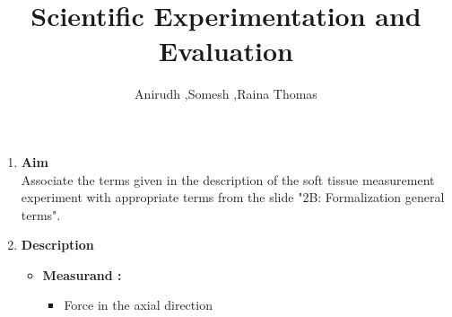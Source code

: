 \documentclass[10pt,a4paper]{article}
\author{Anirudh ,Somesh ,Raina Thomas}
\title{
	\textbf{Scientific Experimentation and Evaluation}
	}
\begin{document}
	

\Large
\begin{enumerate}[label=\Roman*]
\item
\Large{\textbf{Aim}}\\

Associate the terms given in the description of the soft tissue measurement experiment with appropriate terms from the slide "2B: Formalization general terms".
\vspace{0.3cm}
\item
\Large{\textbf{Description}}\\

\begin{itemize}
	\item	
	\textbf{Measurand :}
	\begin{itemize}
		\item
		Force in the axial direction
	\end{itemize}
	

\end{itemize}
\end{enumerate}
\end{document}
